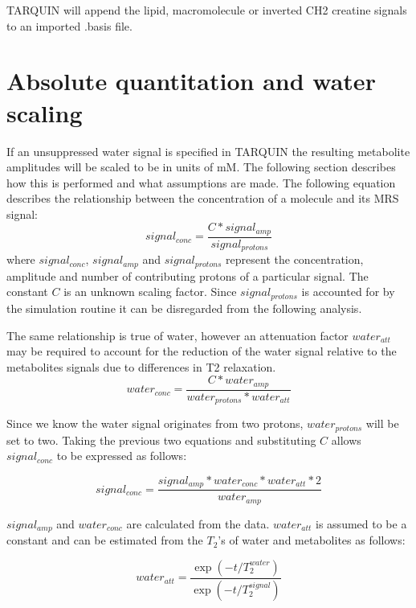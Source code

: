\documentclass[a4paper,12pt]{article}
\begin{document}
TARQUIN will append the lipid, macromolecule or inverted CH2 creatine signals to an imported .basis file.

\section{Absolute quantitation and water scaling}
\label{ws}
If an unsuppressed water signal is specified in TARQUIN the resulting metabolite amplitudes will be scaled to be in units of mM.  The following section describes how this is performed and what assumptions are made.
The following equation describes the relationship between the concentration of a molecule and its MRS signal:
\begin{equation}
signal_{conc} = \frac{C * signal_{amp}}{signal_{protons}}
\end{equation}
where $signal_{conc}$, $signal_{amp}$ and $signal_{protons}$ represent the concentration, amplitude and number of contributing protons of a particular signal. The constant $C$ is an unknown scaling factor. Since $signal_{protons}$ is accounted for by the simulation routine it can be disregarded from the following analysis.

The same relationship is true of water, however an attenuation factor $water_{att}$ may be required to account for the reduction of the water signal relative to the metabolites signals due to differences in T2 relaxation.
\begin{equation}
water_{conc} = \frac{C * water_{amp}}{water_{protons} * water_{att}}
\end{equation}

Since we know the water signal originates from two protons, $water_{protons}$ will be set to two.  Taking the previous two equations and substituting $C$ allows $signal_{conc}$ to be expressed as follows:

\begin{equation}
signal_{conc} = \frac{signal_{amp} * water_{conc} * water_{att} * 2}{water_{amp}}
\end{equation}

$signal_{amp}$ and $water_{conc}$ are calculated from the data. $water_{att}$ is assumed to be a constant and can be estimated from the $T_2$'s of water and metabolites as follows:

\begin{equation}
water_{att} = \frac{\exp(-t/T_2^{water})}{\exp(-t/T_2^{signal})}
\end{equation}
\end{document}
